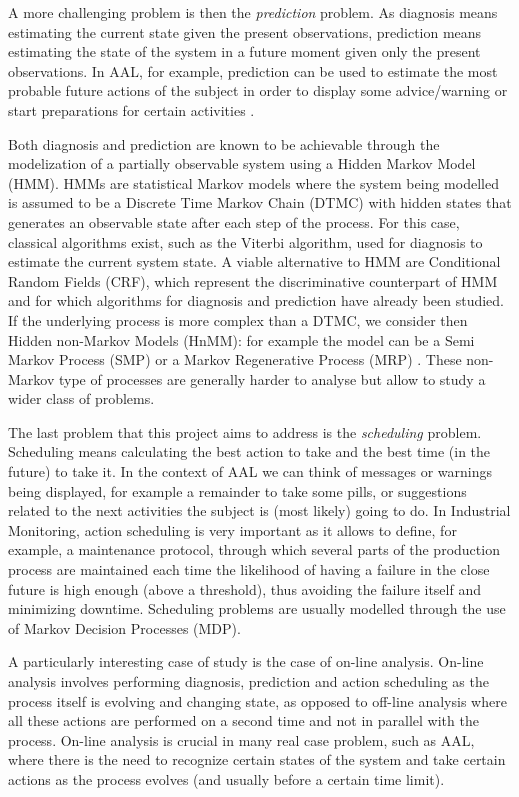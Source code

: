 \documentclass{article}
\begin{document}
        A more challenging problem is then the \textit{prediction} problem. As diagnosis means estimating the current state given the present observations, prediction means estimating the state of the system in a future moment given only the present observations. In AAL, for example, prediction can be used to estimate the most probable future actions of the subject in order to display some advice/warning or start preparations for certain activities \cite{epew16}.
        
        Both diagnosis and prediction are known to be achievable through the modelization of a partially observable system using a Hidden Markov Model (HMM). HMMs are statistical Markov models where the system being modelled is assumed to be a Discrete Time Markov Chain (DTMC) with hidden states that generates an observable state after each step of the process. For this case, classical algorithms exist, such as the Viterbi algorithm, used for diagnosis to estimate the current system state. A viable alternative to HMM are Conditional Random Fields (CRF), which represent the discriminative counterpart of HMM and for which algorithms for diagnosis and prediction have already been studied. If the underlying process is more complex than a DTMC, we consider then Hidden non-Markov Models (HnMM): for example the model can be a Semi Markov Process (SMP) or a Markov Regenerative Process (MRP) \cite{logothetis1995markov}. These non-Markov type of processes are generally harder to analyse but allow to study a wider class of problems.
        
        The last problem that this project aims to address is the \textit{scheduling} problem. Scheduling means calculating the best action to take and the best time (in the future) to take it. In the context of AAL we can think of messages or warnings being displayed, for example a remainder to take some pills, or suggestions related to the next activities the subject is (most likely) going to do. In Industrial Monitoring, action scheduling is very important as it allows to define, for example, a maintenance protocol, through which several parts of the production process are maintained each time the likelihood of having a failure in the close future is high enough (above a threshold), thus avoiding the failure itself and minimizing downtime. Scheduling problems are usually modelled through the use of Markov Decision Processes (MDP).
        
        A particularly interesting case of study is the case of on-line analysis. On-line analysis involves performing diagnosis, prediction and action scheduling as the process itself is evolving and changing state, as opposed to off-line analysis where all these actions are performed on a second time and not in parallel with the process. On-line analysis is crucial in many real case problem, such as AAL, where there is the need to recognize certain states of the system and take certain actions as the process evolves (and usually before a certain time limit).
        
\end{document}
